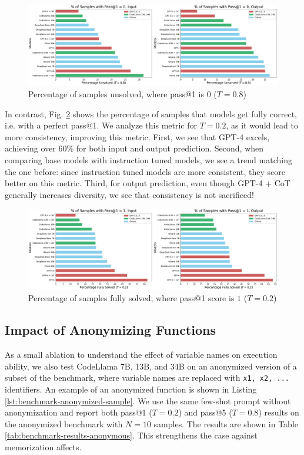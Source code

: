 \begin{figure}[H]
     \centering
     \includegraphics[width=\textwidth]{figs/diversity/unsolved_analysis_0.8.pdf}
     \caption{Percentage of samples unsolved, where pass@1 is $0$ ($T=0.8$)}
     \label{fig:sample-frequency-unsolved}
\end{figure}

In contrast, Fig. \ref{fig:sample-frequency-fully-solved} shows the percentage of samples that models get fully correct, i.e. with a perfect pass@1. We analyze this metric for $T=0.2$, as it would lead to more consistency, improving this metric. First, we see that GPT-4 excels, achieving over 60\% for both input and output prediction. Second, when comparing base models with instruction tuned models, we see a trend matching the one before: since instruction tuned models are more consistent, they score better on this metric. Third, for output prediction, even though GPT-4 + CoT generally increases diversity, we see that consistency is not sacrificed!

\begin{figure}[H]
     \centering
     \includegraphics[width=\textwidth]{figs/diversity/fully_solved_analysis_0.2.pdf}
     \caption{Percentage of samples fully solved, where pass@1 score is $1$ ($T=0.2$)}
     
     \label{fig:sample-frequency-fully-solved}
\end{figure}


\subsection{Impact of Anonymizing Functions} \label{sec:appendix-anonymization}
As a small ablation to understand the effect of variable names on execution ability, we also test CodeLlama 7B, 13B, and 34B on an anonymized version of a subset of the benchmark, where variable names are replaced with \texttt{x1, x2, ...} identifiers. An example of an anonymized function is shown in Listing \ref{lst:benchmark-anonymized-sample}. We use the same few-shot prompt without anonymization and report both pass@1 ($T=0.2$) and pass@5 ($T=0.8$) results on the anonymized benchmark with $N=10$ samples. The results are shown in Table \ref{tab:benchmark-results-anonymous}. This strengthens the case against memorization affects.

